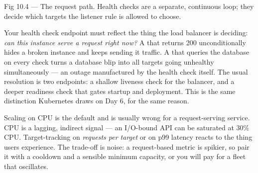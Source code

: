 \begin{wbfigure}{Fig 10.4 — The request path. Health checks are a separate, continuous loop; they decide which targets the listener rule is allowed to choose.}
\end{wbfigure}

\begin{reliability}
Your health check endpoint must reflect the thing the load balancer is deciding: \emph{can this instance serve a request right now?} A  that returns 200 unconditionally hides a broken instance and keeps sending it traffic. A  that queries the database on every check turns a database blip into all targets going unhealthy simultaneously --- an outage manufactured by the health check itself. The usual resolution is two endpoints: a shallow liveness check for the balancer, and a deeper readiness check that gates startup and deployment. This is the same distinction Kubernetes draws on Day 6, for the same reason.
\end{reliability}

\begin{tradeoff}
Scaling on CPU is the default and is usually wrong for a request-serving service. CPU is a lagging, indirect signal --- an I/O-bound API can be saturated at 30\% CPU. Target-tracking on \emph{requests per target} or on p99 latency reacts to the thing users experience. The trade-off is noise: a request-based metric is spikier, so pair it with a cooldown and a sensible minimum capacity, or you will pay for a fleet that oscillates.
\end{tradeoff}

